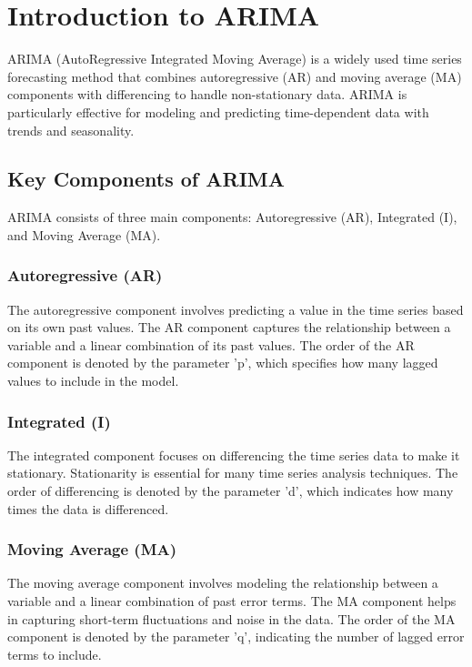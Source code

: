 \documentclass{article}
\begin{document}
\section{Introduction to ARIMA}

ARIMA (AutoRegressive Integrated Moving Average) is a widely used time series forecasting method that combines autoregressive (AR) and moving average (MA) components with differencing to handle non-stationary data. ARIMA is particularly effective for modeling and predicting time-dependent data with trends and seasonality.

\subsection{Key Components of ARIMA}

ARIMA consists of three main components: Autoregressive (AR), Integrated (I), and Moving Average (MA).

\subsubsection{Autoregressive (AR)}
The autoregressive component involves predicting a value in the time series based on its own past values. The AR component captures the relationship between a variable and a linear combination of its past values. The order of the AR component is denoted by the parameter 'p', which specifies how many lagged values to include in the model.

\subsubsection{Integrated (I)}
The integrated component focuses on differencing the time series data to make it stationary. Stationarity is essential for many time series analysis techniques. The order of differencing is denoted by the parameter 'd', which indicates how many times the data is differenced.

\subsubsection{Moving Average (MA)}
The moving average component involves modeling the relationship between a variable and a linear combination of past error terms. The MA component helps in capturing short-term fluctuations and noise in the data. The order of the MA component is denoted by the parameter 'q', indicating the number of lagged error terms to include.
\end{document}
